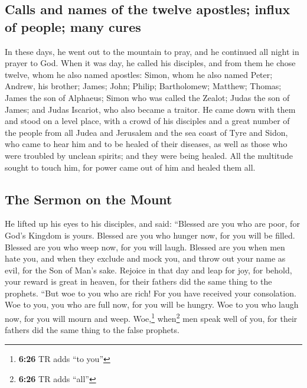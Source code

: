 \begin{paracol}{2}
\begin{otherlanguage}{english}
\hypertarget{calls-and-names-of-the-twelve-apostles-influx-of-people-many-cures}{%
\subsection{Calls and names of the twelve apostles; influx of people;
many
cures}\label{calls-and-names-of-the-twelve-apostles-influx-of-people-many-cures}}

 In these days, he went out to the mountain to pray, and
he continued all night in prayer to God.  When it was
day, he called his disciples, and from them he chose twelve, whom he
also named apostles:  Simon, whom he also named Peter;
Andrew, his brother; James; John; Philip; Bartholomew; 
Matthew; Thomas; James the son of Alphaeus; Simon who was called the
Zealot;  Judas the son of James; and Judas Iscariot, who
also became a traitor.  He came down with them and stood
on a level place, with a crowd of his disciples and a great number of
the people from all Judea and Jerusalem and the sea coast of Tyre and
Sidon, who came to hear him and to be healed of their diseases,
 as well as those who were troubled by unclean spirits;
and they were being healed.  All the multitude sought to
touch him, for power came out of him and healed them all.

\hypertarget{the-sermon-on-the-mount}{%
\subsection{The Sermon on the Mount}\label{the-sermon-on-the-mount}}

 He lifted up his eyes to his disciples, and said:
``Blessed are you who are poor, for God's Kingdom is yours.
 Blessed are you who hunger now, for you will be filled.
Blessed are you who weep now, for you will laugh. 
Blessed are you when men hate you, and when they exclude and mock you,
and throw out your name as evil, for the Son of Man's sake.
 Rejoice in that day and leap for joy, for behold, your
reward is great in heaven, for their fathers did the same thing to the
prophets.  ``But woe to you who are rich! For you have
received your consolation.  Woe to you, you who are full
now, for you will be hungry. Woe to you who laugh now, for you will
mourn and weep.  Woe,\footnote{\textbf{6:26} TR adds ``to
  you''} when\footnote{\textbf{6:26} TR adds ``all''} men speak well of
you, for their fathers did the same thing to the false prophets.


\end{otherlanguage}
\end{paracol}
